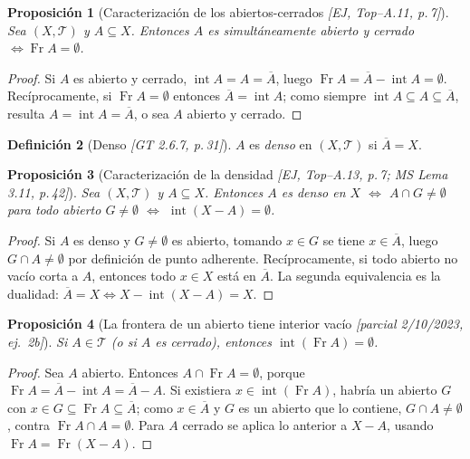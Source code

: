 \documentclass[11pt,a4paper]{article}
\theoremstyle{definition}
\newtheorem{definicion}{Definición}[section]
\theoremstyle{plain}
\newtheorem{proposicion}[definicion]{Proposición}
\newcommand{\fnt}[1]{{\normalfont\small\itshape\color{gray!150!black}[#1]}}
\newcommand{\cl}[1]{\overline{#1}}
\newcommand{\intr}{\operatorname{int}}
\newcommand{\fr}{\operatorname{Fr}}
\newcommand{\tp}{\mathcal{T}}
\begin{document}
\begin{proposicion}[Caracterización de los abiertos-cerrados \fnt{EJ, Top--A.11, p.\,7}]\label{pr:clopen}
Sea $(X,\tp)$ y $A\subseteq X$. Entonces $A$ es simultáneamente abierto y cerrado $\iff \fr A=\emptyset$.
\end{proposicion}

\begin{proof}
Si $A$ es abierto y cerrado, $\intr A=A=\cl A$, luego $\fr A=\cl A-\intr A=\emptyset$. Recíprocamente, si $\fr A=\emptyset$ entonces $\cl A=\intr A$; como siempre $\intr A\subseteq A\subseteq \cl A$, resulta $A=\intr A=\cl A$, o sea $A$ abierto y cerrado.
\end{proof}

\begin{definicion}[Denso \fnt{GT 2.6.7, p.\,31}]
$A$ es \emph{denso} en $(X,\tp)$ si $\cl A=X$.
\end{definicion}

\begin{proposicion}[Caracterización de la densidad \fnt{EJ, Top--A.13, p.\,7; MS Lema 3.11, p.\,42}]
Sea $(X,\tp)$ y $A\subseteq X$. Entonces $A$ es denso en $X$ $\iff$ $A\cap G\ne\emptyset$ para todo abierto $G\ne\emptyset$ $\iff$ $\intr(X-A)=\emptyset$.
\end{proposicion}

\begin{proof}
Si $A$ es denso y $G\ne\emptyset$ es abierto, tomando $x\in G$ se tiene $x\in\cl A$, luego $G\cap A\ne\emptyset$ por definición de punto adherente. Recíprocamente, si todo abierto no vacío corta a $A$, entonces todo $x\in X$ está en $\cl A$. La segunda equivalencia es la dualidad: $\cl A=X\iff X-\intr(X-A)=X$.
\end{proof}

\begin{proposicion}[La frontera de un abierto tiene interior vacío \fnt{parcial 2/10/2023, ej.\ 2b}]
Si $A\in\tp$ (o si $A$ es cerrado), entonces $\intr(\fr A)=\emptyset$.
\end{proposicion}

\begin{proof}
Sea $A$ abierto. Entonces $A\cap\fr A=\emptyset$, porque $\fr A=\cl A-\intr A=\cl A-A$. Si existiera $x\in\intr(\fr A)$, habría un abierto $G$ con $x\in G\subseteq\fr A\subseteq\cl A$; como $x\in\cl A$ y $G$ es un abierto que lo contiene, $G\cap A\ne\emptyset$, contra $\fr A\cap A=\emptyset$. Para $A$ cerrado se aplica lo anterior a $X-A$, usando $\fr A=\fr(X-A)$.
\end{proof}
\end{document}
